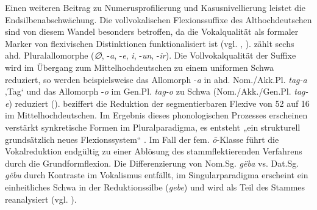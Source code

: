 Einen weiteren Beitrag zu Numerusprofilierung und Kasusnivellierung leistet die Endsilbenabschwächung. Die vollvokalischen Flexionssuffixe des Althochdeutschen sind von diesem Wandel besonders betroffen, da die Vokalqualität als formaler Marker von flexivischen Distinktionen funktionalisiert ist (vgl. \citealt[80]{Kürschner2008a}, \citealt[1172]{Sonderegger2000}). \citet[109]{Werner1969} zählt sechs ahd. Pluralallomorphe (\textit{∅}, -\textit{a}, -\textit{e}, \textit{i}, -\textit{un}, -\textit{ir}). Die Vollvokalqualität der Suffixe wird im Übergang zum Mittelhochdeutschen zu einem uniformen Schwa reduziert, so werden beispielsweise das Allomorph -\textit{a} in ahd. Nom./Akk.Pl. \textit{tag-a} ‚Tag‘ und das Allomorph -\textit{o} im Gen.Pl. \textit{tag-o} zu Schwa (Nom./Akk./Gen.Pl. \textit{tag-e}) reduziert (). \citet[246]{Sonderegger1979} beziffert die Reduktion der segmentierbaren Flexive von 52 auf 16 im Mittelhochdeutschen. Im Ergebnis dieses phonologischen Prozesses erscheinen verstärkt synkretische Formen im Pluralparadigma, es entsteht „ein strukturell grundsätzlich neues Flexionssystem“ \citep[1691]{Solms2004}. Im Fall der fem. \textit{ō}{}-Klasse führt die Vokalreduktion endgültig zu einer Ablösung des stammflektierenden Verfahrens durch die Grundformflexion. Die Differenzierung von Nom.Sg. \textit{gëba} vs. Dat.Sg. \textit{gëbu} durch Kontraste im Vokalismus entfällt, im Singularparadigma erscheint ein einheitliches Schwa in der Reduktionssilbe (\textit{gebe}) und wird als Teil des Stammes reanalysiert (vgl. \citealt[87]{Kürschner2008a}).


